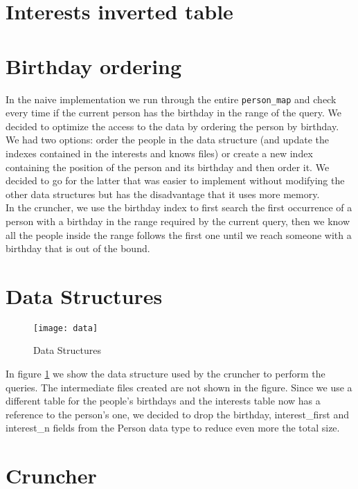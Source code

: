 \section{Interests inverted table}


\section{Birthday ordering}
In the naive implementation we run through the entire \texttt{person\_map} and check every time if the current person has the birthday in the range of the query. We decided to optimize the access to the data by ordering the person by birthday. We had two options: order the people in the data structure (and update the indexes contained in the interests and knows files) or create a new index containing the position of the person and its birthday and then order it. We decided to go for the latter that was easier to implement without modifying the other data structures but has the disadvantage that it uses more memory. \\
In the cruncher, we use the birthday index to first search the first occurrence of a person with a birthday in the range required by the current query, then we know all the people inside the range follows the first one until we reach someone with a birthday that is out of the bound.

\section{Data Structures}

\begin{figure}[tbh]
\texttt{[image: data]}
\caption[Data]{Data Structures}
\label{fig:data}
\end{figure}

In figure \ref{fig:data} we show the data structure used by the cruncher to perform the queries. The intermediate files created are not shown in the figure. Since we use a different table for the people's birthdays and the interests table now has a reference to the person's one, we decided to drop the birthday, interest\_first and interest\_n fields from the Person data type to reduce even more the total size.


\section{Cruncher}


